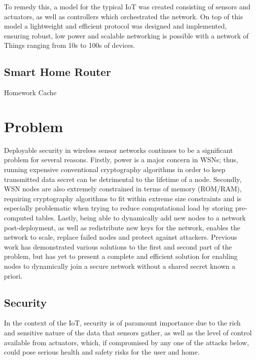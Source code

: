 \documentclass[conference]{./sty/IEEEtran}
\begin{document}
To remedy this, a model for the typical IoT was created consisting of sensors and actuators, as well as controllers which orchestrated the network. On top of this model a lightweight and efficient protocol was designed and implemented, ensuring robust, low power and scalable networking is possible with a network of Things ranging from 10s to 100s of devices.

\subsection{Smart Home Router} %
\label{sub:integration}
Homework Cache \cite{InformationPlane} \cite{DEBSChallenge}


\section{Problem} %
\label{sec:Problem}
Deployable security in wireless sensor networks continues to be a significant problem for several reasons. Firstly, power is a major concern in WSNs; thus, running expensive conventional cryptography algorithms in order to keep transmitted data secret can be detrimental to the lifetime of a node. Secondly, WSN nodes are also extremely constrained in terms of memory (ROM/RAM), requiring cryptography algorithms to fit within extreme size constraints and is especially problematic when trying to reduce computational load by storing pre-computed tables. Lastly, being able to dynamically add new nodes to a network post-deployment, as well as redistribute new keys for the network, enables the network to scale, replace failed nodes and protect against attackers. Previous work has demonstrated various solutions to the first and second part of the problem, but has yet to present a complete and efficient solution for enabling nodes to dynamically join a secure network without a shared secret known a priori.

\subsection{Security} %
\label{sub:security}
In the context of the IoT, security is of paramount importance due to the rich and sensitive nature of the data that sensors gather, as well as the level of control available from actuators, which, if compromised by any one of the attacks below, could pose serious health and safety risks for the user and home. 
\end{document}
